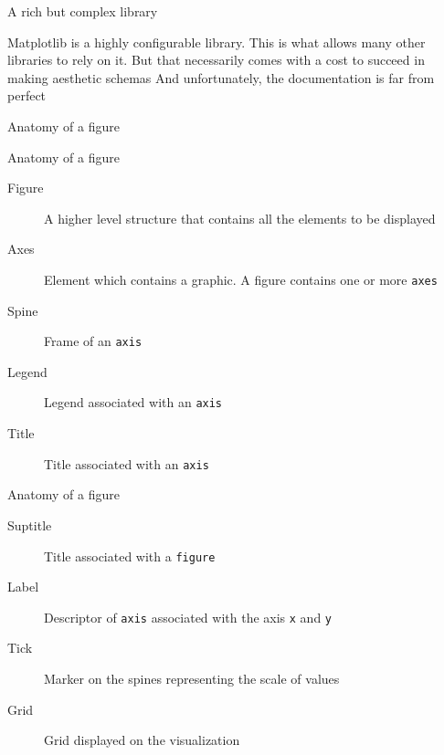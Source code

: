 \begin{frame}{A rich but complex library}
    \begin{itemize}
        \positem Matplotlib is a highly configurable library. This is what allows many other libraries to rely on it.
        \negitem But that necessarily comes with a cost to succeed in making aesthetic schemas
        \negitem And unfortunately, the documentation is far from perfect
    \end{itemize}
    
\end{frame}

\begin{frame}{Anatomy of a figure}
\end{frame}

\begin{frame}{Anatomy of a figure}
    \begin{minipage}{0.49\linewidth}
        \begin{description}
          \item[Figure] A higher level structure that contains all the elements to be displayed
          \item[Axes] Element which contains a graphic. A figure contains one or more \texttt{axes}
          \item[Spine] Frame of an \texttt{axis}
          \item[Legend] Legend associated with an \texttt{axis}
          \item[Title] Title associated with an \texttt{axis}
      \end{description}
    \end{minipage}
    \begin{minipage}{0.49\linewidth}
    \end{minipage}
\end{frame}

\begin{frame}{Anatomy of a figure}
    \begin{minipage}{0.49\linewidth}
        \begin{description}
            \item[Suptitle] Title associated with a \texttt{figure}
            \item[Label] Descriptor of \texttt{axis} associated with the axis \texttt{x} and \texttt{y}
            \item[Tick] Marker on the spines representing the scale of values
            \item[Grid] Grid displayed on the visualization
        \end{description}
    \end{minipage}
    \begin{minipage}{0.49\linewidth}
    \end{minipage}
\end{frame}


